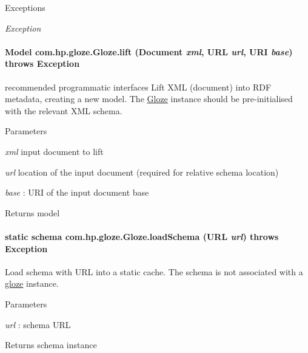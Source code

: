 \begin{DoxyExceptions}{Exceptions}
\item[{\em Exception}]\end{DoxyExceptions}
\hypertarget{classcom_1_1hp_1_1gloze_1_1_gloze_a772e519e007a8d678dee15a1f0128e40}{
\paragraph[{lift}]{\setlength{\rightskip}{0pt plus 5cm}Model com.hp.gloze.Gloze.lift (Document {\em xml}, \/  URL {\em url}, \/  URI {\em base})  throws Exception }\hfill}
\label{classcom_1_1hp_1_1gloze_1_1_gloze_a772e519e007a8d678dee15a1f0128e40}
recommended programmatic interfaces Lift XML (document) into RDF metadata, creating a new model. The \hyperlink{classcom_1_1hp_1_1gloze_1_1_gloze}{Gloze} instance should be pre-\/initialised with the relevant XML schema. 
\begin{DoxyParams}{Parameters}
\item[{\em xml}]input document to lift \item[{\em url}]location of the input document (required for relative schema location) \item[{\em base}]: URI of the input document base \end{DoxyParams}
\begin{DoxyReturn}{Returns}
model 
\end{DoxyReturn}
\hypertarget{classcom_1_1hp_1_1gloze_1_1_gloze_ab90f0fa4ae77452d28c46cd45a083b44}{
\paragraph[{loadSchema}]{\setlength{\rightskip}{0pt plus 5cm}static schema com.hp.gloze.Gloze.loadSchema (URL {\em url})  throws Exception }\hfill}
\label{classcom_1_1hp_1_1gloze_1_1_gloze_ab90f0fa4ae77452d28c46cd45a083b44}
Load schema with URL into a static cache. The schema is not associated with a \hyperlink{namespacecom_1_1hp_1_1gloze}{gloze} instance. 
\begin{DoxyParams}{Parameters}
\item[{\em url}]: schema URL \end{DoxyParams}
\begin{DoxyReturn}{Returns}
schema instance 
\end{DoxyReturn}

